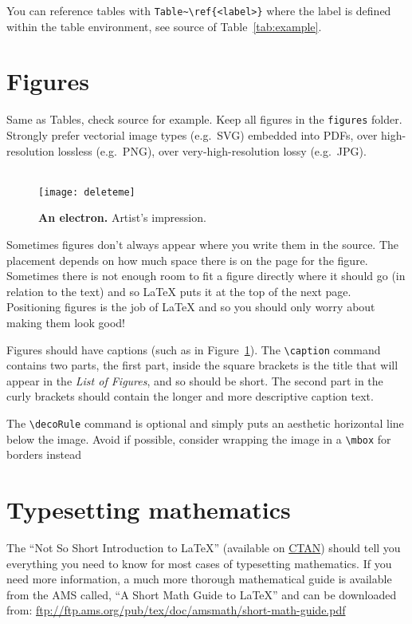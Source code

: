 You can reference tables with \verb|Table~\ref{<label>}| where the label is defined within the table environment, see source of Table~\ref{tab:example}.

\section{Figures}

Same as Tables, check source for example. Keep all figures in the \verb|figures| folder. Strongly prefer vectorial image types (e.g.\ SVG) embedded into PDFs, over high-resolution lossless (e.g.\ PNG), over very-high-resolution lossy (e.g.\ JPG).

\begin{figure}[ht]
\centering
\decoRule\\ %
\texttt{[image: deleteme]}
\decoRule\\ %
\caption[Electron]{%
  \textbf{An electron.}
  Artist's impression.
}
\label{fig:electron}
\end{figure}

Sometimes figures don't always appear where you write them in the source. The placement depends on how much space there is on the page for the figure. Sometimes there is not enough room to fit a figure directly where it should go (in relation to the text) and so \LaTeX{} puts it at the top of the next page. Positioning figures is the job of \LaTeX{} and so you should only worry about making them look good!

Figures should have captions (such as in Figure~\ref{fig:electron}). The \verb|\caption| command contains two parts, the first part, inside the square brackets is the title that will appear in the \emph{List of Figures}, and so should be short. The second part in the curly brackets should contain the longer and more descriptive caption text.

The \verb|\decoRule| command is optional and simply puts an aesthetic horizontal line below the image. Avoid if possible, consider wrapping the image in a \verb|\mbox| for borders instead


\section{Typesetting mathematics}

The \enquote{Not So Short Introduction to \LaTeX} (available on \href{http://www.ctan.org/tex-archive/info/lshort/english/lshort.pdf}{CTAN}) should tell you everything you need to know for most cases of typesetting mathematics. If you need more information, a much more thorough mathematical guide is available from the AMS called, \enquote{A Short Math Guide to \LaTeX} and can be downloaded from:
\url{ftp://ftp.ams.org/pub/tex/doc/amsmath/short-math-guide.pdf}

